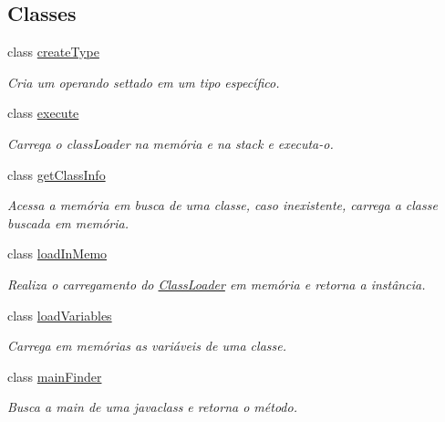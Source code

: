 \subsection*{Classes}
\begin{DoxyCompactItemize}
\item 
class \hyperlink{class_interpreter_1_1create_type}{create\+Type}
\begin{DoxyCompactList}\small\item\em Cria um operando settado em um tipo específico. \end{DoxyCompactList}\item 
class \hyperlink{class_interpreter_1_1execute}{execute}
\begin{DoxyCompactList}\small\item\em Carrega o class\+Loader na memória e na stack e executa-\/o. \end{DoxyCompactList}\item 
class \hyperlink{class_interpreter_1_1get_class_info}{get\+Class\+Info}
\begin{DoxyCompactList}\small\item\em Acessa a memória em busca de uma classe, caso inexistente, carrega a classe buscada em memória. \end{DoxyCompactList}\item 
class \hyperlink{class_interpreter_1_1load_in_memo}{load\+In\+Memo}
\begin{DoxyCompactList}\small\item\em Realiza o carregamento do \hyperlink{class_class_loader}{Class\+Loader} em memória e retorna a instância. \end{DoxyCompactList}\item 
class \hyperlink{class_interpreter_1_1load_variables}{load\+Variables}
\begin{DoxyCompactList}\small\item\em Carrega em memórias as variáveis de uma classe. \end{DoxyCompactList}\item 
class \hyperlink{class_interpreter_1_1main_finder}{main\+Finder}
\begin{DoxyCompactList}\small\item\em Busca a main de uma javaclass e retorna o método. \end{DoxyCompactList}\end{DoxyCompactItemize}
